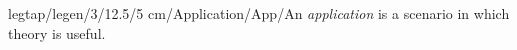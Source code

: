 legtap/legen/3/12.5/5 cm/Application/App/{An \emph{application} is a scenario in which theory is useful.}